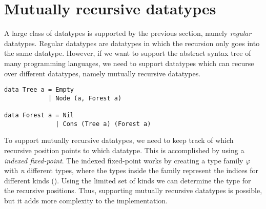 \section{Mutually recursive datatypes}
A large class of datatypes is supported by the previous section, namely \textit{regular} datatypes. Regular datatypes are datatypes in which the recursion only goes into the same datatype. However, if we want to support the abstract syntax tree of many programming languages, we need to support datatypes which can recurse over different datatypes, namely mutually recursive datatypes.

\begin{verbatim}
data Tree a = Empty 
            | Node (a, Forest a)

data Forest a = Nil
              | Cons (Tree a) (Forest a)
\end{verbatim}

To support mutually recursive datatypes, we need to keep track of which recursive position points to which datatype. This is accomplished by using a \textit{indexed fixed-point}\cite{yakushev2009generic}. The indexed fixed-point works by creating a type family $\varphi$ with \textit{n} different types, where the types inside the family represent the indices for different kinds (\inlinehaskell{*!$_{\varphi}$!}). Using the limited set of kinds we can determine the type for the recursive positions. Thus, supporting mutually recursive datatypes is possible, but it adds more complexity to the implementation.   
